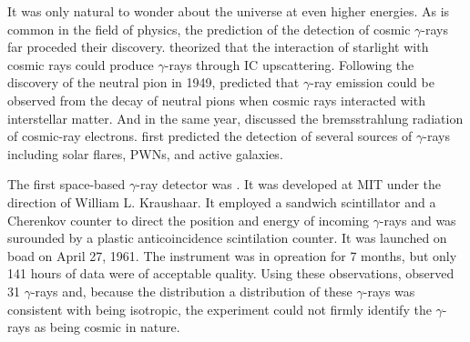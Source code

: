 It was only natural to wonder about the universe at even higher energies.
As is common in the field of physics, the prediction of
the detection of cosmic $\gamma$-rays far proceded their discovery.
\cite{feenberg_1948_interaction-cosmic-ray} theorized that the interaction
of starlight with cosmic rays could produce $\gamma$-rays through
\ac{IC} upscattering.  Following the discovery of the neutral
pion in 1949, \cite{hayakawa_1952_propagation-cosmic}
predicted that $\gamma$-ray emission could be observed from the
decay of neutral pions when cosmic rays interacted with interstellar
matter.  And in the same year, \cite{hutchinson_1952_possible-relation}
discussed the bremsstrahlung radiation of cosmic-ray electrons.
\cite{morrison_1958_gamma-ray-astronomy} first predicted the detection
of several sources of $\gamma$-rays including solar flares, \acp{PWN},
and active galaxies.

    



The first space-based $\gamma$-ray detector was \explorerxi
\cite{kraushaar_1965_explorer-experiment}.  It was developed at \ac{MIT}
under the direction of William L. Kraushaar.  It employed a sandwich
scintillator and a Cherenkov counter to direct the position and energy
of incoming $\gamma$-rays and was surounded by a plastic anticoincidence
scintilation counter.  It was launched on boad \explorerxi on April 27,
1961.  The instrument was in opreation for 7 months, but only 141 hours
of data were of acceptable quality.  Using these observations, \explorerxi
observed 31 $\gamma$-rays and, because the distribution a distribution of
these $\gamma$-rays was consistent with being isotropic, the experiment
could not firmly identify the $\gamma$-rays as being cosmic in nature.


